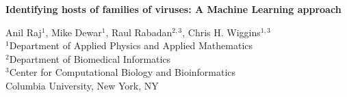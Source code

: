 \documentclass[11pt,amsmath,amstex]{article}
\begin{document}
\begin{center}
\pagestyle{empty}
\textbf{Identifying hosts of families of viruses: A Machine Learning approach}

\small{
Anil Raj$^{1}$, Mike Dewar$^{1}$, Raul Rabadan$^{2,3}$, Chris H. Wiggins$^{1,3}$\\
$^{1}$Department of Applied Physics and Applied Mathematics\\
$^{2}$Department of Biomedical Informatics\\
$^{3}$Center for Computational Biology and Bioinformatics\\
Columbia University, New York, NY\\
}
\end{center}





\end{document}

